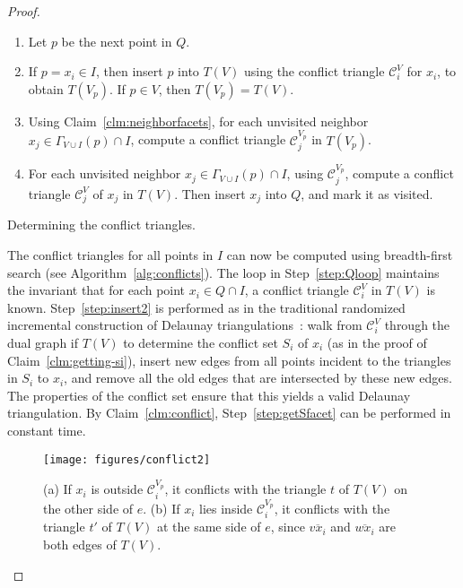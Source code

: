 \documentclass{siamltex}
\newcommand{\tconf}{\mathcal{C}}
\begin{document}
\begin{proof}
\begin{algorithm}
\begin{enumerate}
\begin{enumerate}
 \item Let $p$ be the next point in $Q$.
 \item\label{step:insert2} If $p = x_i \in I$, then insert $p$ into $T(V)$ 
 using the conflict triangle $\tconf^V_i$ for $x_i$, to obtain $T(V_p)$.
 If $p \in V$, then $T(V_p) = T(V)$.
 \item\label{step:applyClaim} Using Claim~\ref{clm:neighborfacets}, for 
            each unvisited neighbor $x_j \in \Gamma_{V \cup I}(p) \cap I$, 
	    compute a conflict triangle $\tconf^{V_p}_j$ in $T(V_p)$.
 \item\label{step:getSfacet} For each unvisited neighbor 
           $x_j \in \Gamma_{V \cup I}(p) \cap I$, using
           $\tconf^{V_p}_j$, compute a conflict triangle $\tconf^V_j$ 
	   of $x_j$ in $T(V)$. Then
           insert $x_j$ into $Q$, and mark it as visited.
\end{enumerate}
\end{enumerate}
\caption{Determining the conflict triangles.}
\label{alg:conflicts}
\end{algorithm}

The conflict triangles for all points in $I$ can now be computed using 
breadth-first search (see Algorithm~\ref{alg:conflicts}). 
The loop in Step~\ref{step:Qloop} maintains the invariant that for each 
point $x_i \in Q \cap I$, a conflict triangle $\tconf^V_i$ in $T(V)$ is known. 
Step~\ref{step:insert2} is performed as in the traditional randomized
incremental construction of Delaunay 
triangulations~\cite[Chapter~9]{deBergKrOvSc00}: walk from $\tconf_i^V$
through the dual graph if $T(V)$ to determine the conflict set $S_i$
of $x_i$ (as in the proof of Claim~\ref{clm:getting-si}), insert new edges
from all points incident to the triangles in $S_i$ to $x_i$, and remove
all the old edges that are intersected by these new edges. The properties
of the conflict set ensure that this yields a valid Delaunay triangulation.
By Claim~\ref{clm:conflict}, Step~\ref{step:getSfacet} can be performed
in constant time.


\begin{figure}[t]
\begin{center}
\texttt{[image: figures/conflict2]}
\end{center}
\caption{(a) If $x_i$ is outside $\tconf_i^{V_p}$, it conflicts
with the triangle $t$ of $T(V)$ on the other side of $e$.
(b) If $x_i$ lies inside $\tconf_i^{V_p}$, it conflicts with the
triangle $t'$ of $T(V)$ at the same side of $e$, since
$\overline{vx_i}$ and $\overline{wx_i}$ are both
edges of $T(V)$.}\label{fig:conflict}
\end{figure}


\end{proof}
\end{document}
